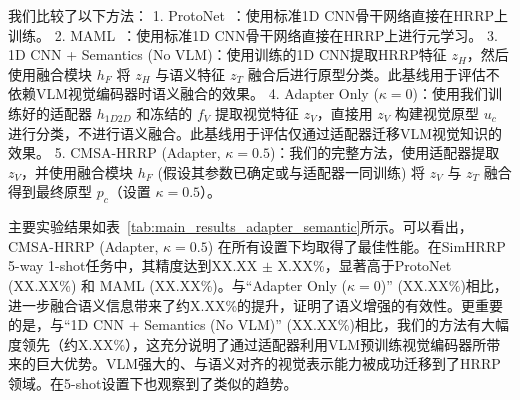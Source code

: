 我们比较了以下方法：
1.  ProtoNet~\cite{Snell2017ProtoNet}：使用标准1D CNN骨干网络直接在HRRP上训练。
2.  MAML~\cite{Finn2017MAML}：使用标准1D CNN骨干网络直接在HRRP上进行元学习。
3.  1D CNN + Semantics (No VLM)：使用训练的1D CNN提取HRRP特征 $z_H$，然后使用融合模块 $h_F$ 将 $z_H$ 与语义特征 $z_T$ 融合后进行原型分类。此基线用于评估不依赖VLM视觉编码器时语义融合的效果。
4.  Adapter Only ($\kappa=0$)：使用我们训练好的适配器 $h_{1D2D}$ 和冻结的 $f_V$ 提取视觉特征 $z_V$，直接用 $z_V$ 构建视觉原型 $u_c$ 进行分类，不进行语义融合。此基线用于评估仅通过适配器迁移VLM视觉知识的效果。
5.  CMSA-HRRP (Adapter, $\kappa=0.5$)：我们的完整方法，使用适配器提取 $z_V$，并使用融合模块 $h_F$ (假设其参数已确定或与适配器一同训练) 将 $z_V$ 与 $z_T$ 融合得到最终原型 $p_c$（设置 $\kappa=0.5$）。

主要实验结果如表~\ref{tab:main_results_adapter_semantic}所示。可以看出，CMSA-HRRP (Adapter, $\kappa=0.5$) 在所有设置下均取得了最佳性能。在SimHRRP 5-way 1-shot任务中，其精度达到XX.XX $\pm$ X.XX\%，显著高于ProtoNet (XX.XX\%) 和 MAML (XX.XX\%)。与“Adapter Only ($\kappa=0$)” (XX.XX\%)相比，进一步融合语义信息带来了约X.XX\%的提升，证明了语义增强的有效性。更重要的是，与“1D CNN + Semantics (No VLM)” (XX.XX\%)相比，我们的方法有大幅度领先（约X.XX\%），这充分说明了通过适配器利用VLM预训练视觉编码器所带来的巨大优势。VLM强大的、与语义对齐的视觉表示能力被成功迁移到了HRRP领域。在5-shot设置下也观察到了类似的趋势。

\begin{table}[h!]
\centering
\caption{小样本HRRP识别精度 (\%) 对比 (适配器版本)}
\label{tab:main_results_adapter_semantic}
\end{table}
\captionsetup{skip=5pt}

